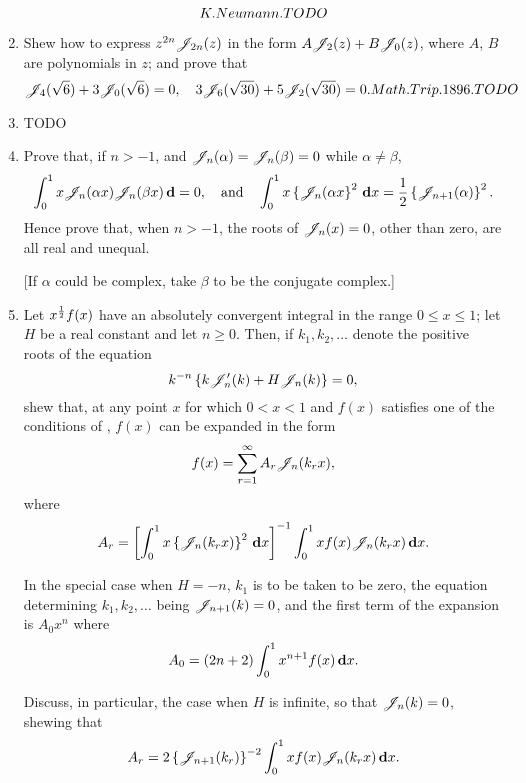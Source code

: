 \documentclass{book}
\begin{document}
\begin{enumerate}
$$  K. Neumann. TODO
  $$
\item
  Shew how to express $z^{2n} \mathscr{J}_{2n}(z)$ in the form
  $A \mathscr{J}_{2}(z) + B \mathscr{J}_{0}(z)$, where $A$, $B$ are polynomials in
  $z$; and prove that
  $$
  \mathscr{J}_{4}(\sqrt{6}) + 3 \mathscr{J}_{0}(\sqrt{6}) = 0,
  \quad
  3 \mathscr{J}_{6}(\sqrt{30}) + 5 \mathscr{J}_{2}(\sqrt{30}) = 0.
  Math. Trip. 1896. TODO
  $$
\item
  TODO
\item
  Prove that, if $n > -1$, and $\mathscr{J}_{n}(\alpha) = \mathscr{J}_{n}(\beta) =
  0$ while $\alpha \neq \beta$,
  $$
  \int_{0}^{1} x \mathscr{J}_{n}(\alpha x) \mathscr{J}_{n}(\beta x) \, \mathbf{d} = 0,
  \quad
  \textrm{and}
  \quad
  \int_{0}^{1} x \left\{ \mathscr{J}_{n}(\alpha x \right\}^{2} \, \mathbf{d} x
  =
  \frac{1}{2} \left\{  \mathscr{J}_{n+1}(\alpha) \right\}^{2}.
  $$
  Hence prove that, when $n > -1$, the roots of $\mathscr{J}_{n}(x)=0$, other
  than zero, are all real and unequal.

  [If $\alpha$ could be complex, take $\beta$ to be the conjugate
  complex.]
\item
  Let $x^{\frac{1}{2}} f(x)$ have an absolutely convergent integral in the
  range $0 \leq x \leq 1$; let $H$ be a real constant and let $n \geq
  0$. Then, if $k_{1}, k_{2}, \ldots$ denote the positive roots of
  the equation
  $$
  k^{-n}
  \left\{  k \mathscr{J}'_{n}(k) + H \mathscr{J}_{n}(k) \right\}
  =
  0,
  $$
  shew that, at any point $x$ for which $0 < x < 1$ and $f(x)$
  satisfies one of the conditions of ,
  $f(x)$ can be expanded in the form
  $$
  f(x) = \sum_{r=1}^{\infty} A_{r} \mathscr{J}_{n}(k_{r} x),
  $$
  where
  $$
  A_{r}
  =
  \left[  \int_{0}^{1} x \left\{ \mathscr{J}_{n}(k_{r}x) \right\}^{2} \, \mathbf{d} x \right]^{-1}
  \int_{0}^{1} x f(x) \mathscr{J}_{n}(k_{r}x) \, \mathbf{d} x.
  $$

  In the special case when $H = -n$, $k_{1}$ is to be taken to be
  zero, the equation determining $k_{1}, k_{2}, \ldots$ being
  $\mathscr{J}_{n+1}(k) = 0$, and the first term of the expansion is $A_{0}
  x^{n}$ where
  $$
  A_{0} = (2n+2) \int_{0}^{1} x^{n+1} f(x) \, \mathbf{d} x.
  $$

  Discuss, in particular, the case when $H$ is infinite, so that
  $\mathscr{J}_{n}(k)=0$, shewing that
  $$
  A_{r}
  =
  2 \left\{ \mathscr{J}_{n+1}(k_{r}) \right\}^{-2}
  \int_{0}^{1}
  x f(x) \mathscr{J}_{n}(k_{r}x)
  \, \mathbf{d} x.
  $$


\end{enumerate}
\end{document}
